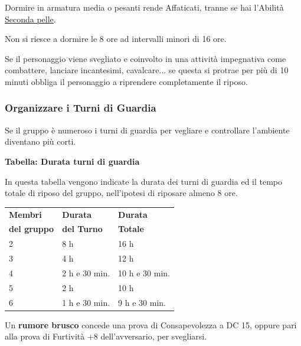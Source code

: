 \begin{multicols}{2}
Dormire in armatura media o pesanti rende Affaticati, tranne se hai l'Abilità \hyperlink{secondapelle}{Seconda pelle}.

Non si riesce a dormire le 8 ore ad intervalli minori di 16 ore.

Se il personaggio viene svegliato e coinvolto in una attività impegnativa come combattere, lanciare incantesimi, cavalcare... se questa si protrae per più di 10 minuti obbliga il personaggio a riprendere completamente il riposo.

\subsubsection{Organizzare i Turni di Guardia}

Se il gruppo è numeroso i turni di guardia per vegliare e controllare l'ambiente diventano più corti.

\medskip{}

\textbf{Tabella: Durata turni di guardia}

In questa tabella vengono indicate la durata dei turni di guardia ed il tempo totale di riposo del gruppo, nell'ipotesi di riposare almeno 8 ore.

\medskip{}

\noindent\begin{tabularx}{0.5\textwidth}{XXX}
\textbf{Membri} &\textbf{Durata}&\textbf{Durata}\\
\textbf{del gruppo}&\textbf{del Turno}&\textbf{Totale}\\
2& 8 h& 16 h\\
3& 4 h & 12 h\\
4& 2 h e 30 min. & 10 h e 30 min.\\
5& 2 h& 10 h\\
6& 1 h e 30 min. & 9 h e 30 min.
\end{tabularx}

\medskip{}

Un \textbf{rumore brusco} concede una prova di Consapevolezza a DC 15, oppure pari alla prova di Furtività +8 dell'avversario, per svegliarsi.

\end{multicols}

\vfill

